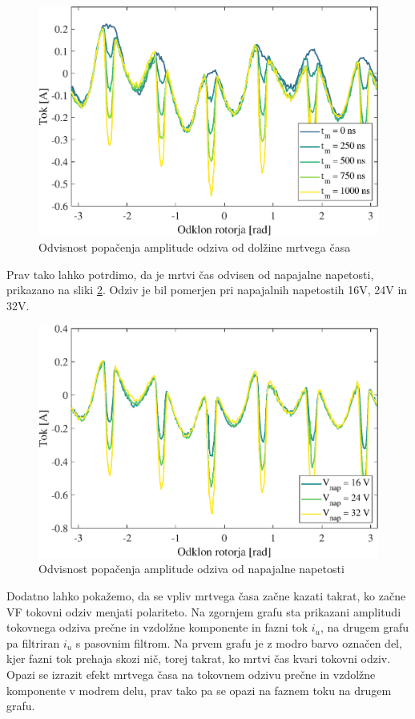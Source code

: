 \documentclass[a4paper,twoside,openright,12pt,slovene]{book}
\begin{document}
\begin{figure}[!htbp]
    \centering
    \includegraphics[width=0.95\columnwidth]{Slike/mrtviCas.eps}
    \caption{\label{mrtviCas} Odvisnost popačenja amplitude odziva od dolžine mrtvega časa}
\end{figure}

Prav tako lahko potrdimo, da je mrtvi čas odvisen od napajalne napetosti, prikazano na sliki \ref{mrtviCasNapetost}. Odziv je bil pomerjen pri napajalnih napetostih 16V, 24V in 32V.

\begin{figure}[!htbp]
    \centering
    \includegraphics[width=0.95\columnwidth]{Slike/mrtviCasNapetost.eps}
    \caption{\label{mrtviCasNapetost} Odvisnost popačenja amplitude odziva od napajalne napetosti }
\end{figure}

\newpage
Dodatno lahko pokažemo, da se vpliv mrtvega časa začne kazati takrat, ko začne VF tokovni odziv menjati polariteto. Na zgornjem grafu sta prikazani amplitudi tokovnega odziva prečne in vzdolžne
komponente in fazni tok $i_u$, na drugem grafu pa filtriran $i_u$ s pasovnim filtrom. Na prvem grafu je z modro barvo označen del, kjer fazni tok prehaja skozi nič, torej takrat, ko mrtvi čas kvari
tokovni odziv. Opazi se izrazit efekt mrtvega časa na tokovnem odzivu prečne in vzdolžne komponente v modrem delu, prav tako pa se opazi na faznem toku na drugem grafu.
\end{document}
